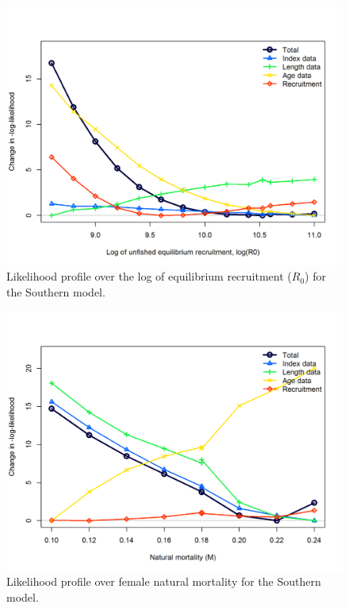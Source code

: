 \documentclass[12pt,]{article}
\begin{document}
\begin{figure}[htbp]
\centering
\includegraphics{Figures/profiles/profile_logR0.S.png}
\caption{Likelihood profile over the log of equilibrium recruitment
(\(R_0\)) for the Southern model. \label{fig:profile_logR0.S}}
\end{figure}

\FloatBarrier

\begin{figure}[htbp]
\centering
\includegraphics{Figures/profiles/profile_M.S.png}
\caption{Likelihood profile over female natural mortality for the
Southern model. \label{fig:profile_M.S}}
\end{figure}
\end{document}
